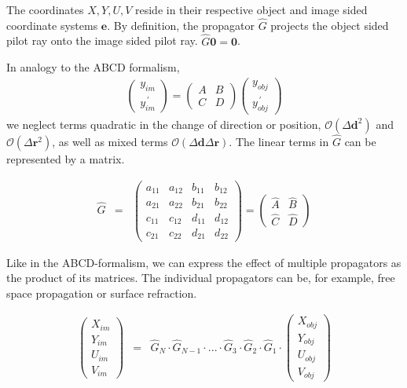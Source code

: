 \documentclass[12pt,a4paper,twoside,openright,BCOR10mm,headsepline,titlepage,abstracton,chapterprefix,final]{scrreprt}
\newcommand\Vector[1]{{\mathbf{#1}}}
\newcommand{\orderof}[1]{\mathcal{O}(#1)}
\begin{document}
The coordinates $X,Y,U,V$ reside in their respective object and image sided coordinate systems $\Vector{e}$.
By definition, the propagator $\hat{G}$ projects the object sided pilot ray onto the image sided pilot ray.
$\hat{G}\Vector{0} = \Vector{0}$.

In analogy to the ABCD formalism, 
\begin{eqnarray}
 \begin{pmatrix}
  y_{im} \\ y^{\,\prime}_{im}
 \end{pmatrix}
 =
 \begin{pmatrix}
   A & B \\ C & D
 \end{pmatrix}
 \begin{pmatrix}
   y_{obj} \\ y^{\,\prime}_{obj}
 \end{pmatrix}
\end{eqnarray}
we neglect terms quadratic in the change of direction or position, 
$\orderof{\Delta\Vector{d}^2}$ and $\orderof{\Delta\Vector{r}^2}$, as well as mixed terms $\orderof{\Delta\Vector{d}\Delta\Vector{r}}$.
The linear terms in $\hat{G}$ can be represented by a matrix.

\begin{eqnarray}
 \hat{G} &=&
 \begin{pmatrix}
  a_{11} & a_{12} & b_{11} & b_{12} \\
  a_{21} & a_{22} & b_{21} & b_{22} \\  
  c_{11} & c_{12} & d_{11} & d_{12} \\
  c_{21} & c_{22} & d_{21} & d_{22} 
 \end{pmatrix}
 =
 \begin{pmatrix}
  \hat{A} & \hat{B} \\
  \hat{C} & \hat{D}
 \end{pmatrix} 
\end{eqnarray}

Like in the ABCD-formalism, we can express the effect of multiple propagators as the product of its matrices.
The individual propagators can be, for example, free space propagation or surface refraction.

\begin{eqnarray}
 \begin{pmatrix}
  X_{im} \\ Y_{im} \\ U_{im} \\ V_{im}
 \end{pmatrix}
 &=&
 \hat{G}_N \cdot \hat{G}_{N-1} \cdot ... \cdot \hat{G}_3 \cdot \hat{G}_2 \cdot \hat{G}_1 \cdot
 \begin{pmatrix}
  X_{obj} \\ Y_{obj} \\ U_{obj} \\ V_{obj}
 \end{pmatrix}
\end{eqnarray}
\end{document}
